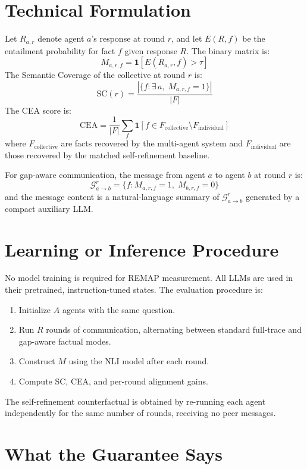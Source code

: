 \documentclass[10pt,twocolumn]{article}
\begin{document}
\section{Technical Formulation}

Let $R_{a, r}$ denote agent $a$'s response at round $r$, and let
$E(R, f)$ be the entailment probability for fact $f$ given response
$R$. The binary matrix is:
\[
M_{a,r,f} = \mathbf{1}[E(R_{a,r}, f) > \tau]
\]
The Semantic Coverage of the collective at round $r$ is:
\[
\text{SC}(r) = \frac{|\{f : \exists\, a,\; M_{a,r,f} = 1\}|}{|F|}
\]
The CEA score is:
\[
\text{CEA} = \frac{1}{|F|}\sum_f \mathbf{1}[f \in F_{\text{collective}}
  \setminus F_{\text{individual}}]
\]
where $F_{\text{collective}}$ are facts recovered by the multi-agent
system and $F_{\text{individual}}$ are those recovered by the
matched self-refinement baseline.

For gap-aware communication, the message from agent $a$ to agent $b$
at round $r$ is:
\[
\mathcal{G}_{a \to b}^r = \{f : M_{a,r,f} = 1,\; M_{b,r,f} = 0\}
\]
and the message content is a natural-language summary of
$\mathcal{G}_{a \to b}^r$ generated by a compact auxiliary LLM.

\section{Learning or Inference Procedure}

No model training is required for REMAP measurement. All LLMs are
used in their pretrained, instruction-tuned states. The evaluation
procedure is:
\begin{enumerate}[itemsep=2pt,parsep=0pt]
  \item Initialize $A$ agents with the same question.
  \item Run $R$ rounds of communication, alternating between
    standard full-trace and gap-aware factual modes.
  \item Construct $M$ using the NLI model after each round.
  \item Compute SC, CEA, and per-round alignment gains.
\end{enumerate}

The self-refinement counterfactual is obtained by re-running each
agent independently for the same number of rounds, receiving no
peer messages.

\section{What the Guarantee Says}
\end{document}
